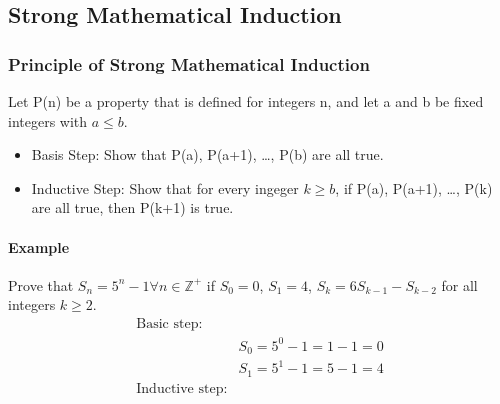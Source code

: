 \subsection{Strong Mathematical Induction}
\hrulefill

\subsubsection*{Principle of Strong Mathematical Induction}
Let P(n) be a property that is defined for integers n, and let a and b be fixed integers with $a \leq b$.
\begin{itemize}
    \item Basis Step: Show that P(a), P(a+1), \dots, P(b) are all true.
    \item Inductive Step: Show that for every ingeger $k \geq b$, if P(a), P(a+1), \dots, P(k) are all true, then P(k+1) is true.
\end{itemize}

\paragraph*{Example}
Prove that $S_n = 5^n - 1 \forall n \in \mathbb{Z}^+$ if $S_0 = 0$, $S_1 = 4$, $S_k = 6S_{k-1} - S_{k-2}$ for all integers $k \geq 2$.
\begin{align*}
    \text{Basic step:}&\\
    &S_0 = 5^0 - 1 = 1 - 1 = 0\\
    &S_1 = 5^1 - 1 = 5 - 1 = 4\\
    \text{Inductive step:}&\\
\end{align*}


